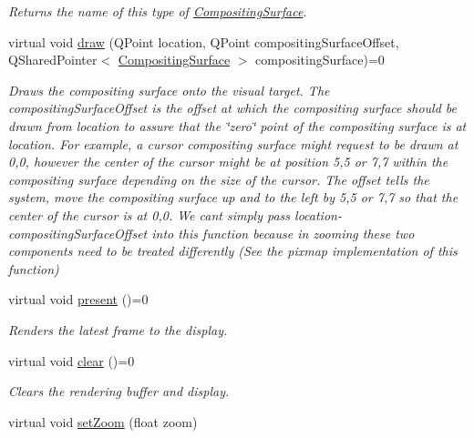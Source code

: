 \begin{DoxyCompactItemize}
\begin{DoxyCompactList}\small\item\em Returns the name of this type of \hyperlink{struct_picto_1_1_compositing_surface}{Compositing\-Surface}. \end{DoxyCompactList}\item 
virtual void \hyperlink{class_picto_1_1_visual_target_a948764671d6721f4dcfd5c8165b0eb5c}{draw} (Q\-Point location, Q\-Point compositing\-Surface\-Offset, Q\-Shared\-Pointer$<$ \hyperlink{struct_picto_1_1_compositing_surface}{Compositing\-Surface} $>$ compositing\-Surface)=0
\begin{DoxyCompactList}\small\item\em Draws the compositing surface onto the visual target. The compositing\-Surface\-Offset is the offset at which the compositing surface should be drawn from location to assure that the \char`\"{}zero\char`\"{} point of the compositing surface is at location. For example, a cursor compositing surface might request to be drawn at 0,0, however the center of the cursor might be at position 5,5 or 7,7 within the compositing surface depending on the size of the cursor. The offset tells the system, move the compositing surface up and to the left by 5,5 or 7,7 so that the center of the cursor is at 0,0. We cant simply pass location-\/compositing\-Surface\-Offset into this function because in zooming these two components need to be treated differently (See the pixmap implementation of this function) \end{DoxyCompactList}\item 
virtual void \hyperlink{class_picto_1_1_visual_target_a914177dc74348568b08aed7dc88648e8}{present} ()=0
\begin{DoxyCompactList}\small\item\em Renders the latest frame to the display. \end{DoxyCompactList}\item 
virtual void \hyperlink{class_picto_1_1_visual_target_a84c690c0c08f1e4b64e40c853fcf0d41}{clear} ()=0
\begin{DoxyCompactList}\small\item\em Clears the rendering buffer and display. \end{DoxyCompactList}\item 
\hypertarget{class_picto_1_1_visual_target_aeb7b31051445e6b56f925c8458791564}{virtual void \hyperlink{class_picto_1_1_visual_target_aeb7b31051445e6b56f925c8458791564}{set\-Zoom} (float zoom)}\label{class_picto_1_1_visual_target_aeb7b31051445e6b56f925c8458791564}


\end{DoxyCompactItemize}
